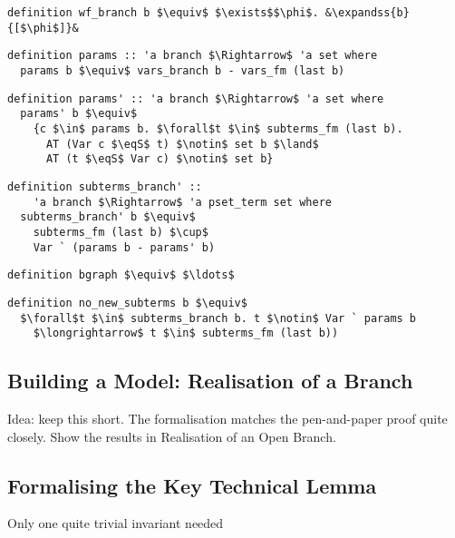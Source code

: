 \documentclass[sigplan,10pt,anonymous,review]{acmart}
\newcommand{\lefttriangle}{\mathrel{\tikz[baseline]{\draw (1ex, 0.75ex) -- (0, 1.25ex) -- (0, 0.25ex) -- cycle;}}}
\newcommand{\expandss}[2]{#1 $\lefttriangle^*$ #2}
\newcommand{\eqS}{\approx_\text{s}}
\begin{document}
\begin{lstlisting}
definition wf_branch b $\equiv$ $\exists$$\phi$. &\expandss{b}{[$\phi$]}&
\end{lstlisting}

\begin{lstlisting}
definition params :: 'a branch $\Rightarrow$ 'a set where
  params b $\equiv$ vars_branch b - vars_fm (last b)
\end{lstlisting}

\begin{lstlisting}
definition params' :: 'a branch $\Rightarrow$ 'a set where
  params' b $\equiv$
    {c $\in$ params b. $\forall$t $\in$ subterms_fm (last b).
      AT (Var c $\eqS$ t) $\notin$ set b $\land$
      AT (t $\eqS$ Var c) $\notin$ set b} 
\end{lstlisting}

\begin{lstlisting}
definition subterms_branch' ::
    'a branch $\Rightarrow$ 'a pset_term set where
  subterms_branch' b $\equiv$
    subterms_fm (last b) $\cup$ 
    Var ` (params b - params' b)
\end{lstlisting}

\begin{lstlisting}
definition bgraph $\equiv$ $\ldots$ 
\end{lstlisting}

\begin{lstlisting}
definition no_new_subterms b $\equiv$
  $\forall$t $\in$ subterms_branch b. t $\notin$ Var ` params b
    $\longrightarrow$ t $\in$ subterms_fm (last b))
\end{lstlisting}

\subsection{Building a Model: Realisation of a Branch}
Idea: keep this short. The formalisation matches the pen-and-paper proof quite closely.
Show the results in Realisation of an Open Branch.

\subsection{Formalising the Key Technical Lemma}
Only one quite trivial invariant needed 
\end{document}
